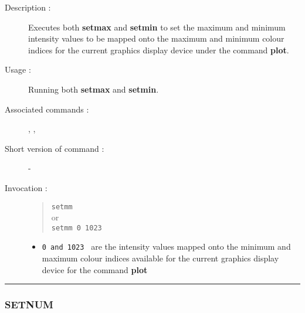 \begin{description}

\item[Description :] Executes both {\bf setmax} and {\bf setmin} to set
the maximum and minimum intensity values to be mapped onto the maximum
and minimum colour indices for the current graphics display device
under the command {\bf plot}.

\item[Usage :] Running both {\bf setmax} and {\bf setmin}.

\item[Associated commands :] {\tt {}},
{\tt {}}, {\tt {}}

\item[Short version of command :] -
\item[Invocation :]

\begin{quote}{\tt  setmm }\\
or \\
{\tt setmm 0 1023 }
\end{quote}

\begin{itemize}

\item {\tt 0 and 1023 } are the intensity values mapped onto the
minimum and maximum colour indices available for the current graphics
display device for the command {\bf plot}

\end{itemize}

\end{description}

\hrule
\subsubsection*{\label{SETNUM}SETNUM}


